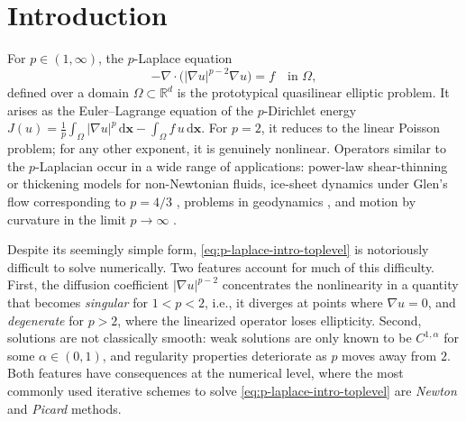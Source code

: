 \documentclass[11pt,pdflatex,sn-mathphys-num]{sn-jnl}
\theoremstyle{thmstyleone}%
\theoremstyle{thmstyletwo}%
\theoremstyle{thmstylethree}%
\newcommand{\bs}[1]{\ensuremath{\boldsymbol{#1}}}
\begin{document}


\maketitle

\section{Introduction}
\label{sec:lifting}
For $p\in(1,\infty)$, the $p$-Laplace equation 
\begin{equation}
\label{eq:p-laplace-intro-toplevel}
-\nabla\cdot\!\bigl(|\nabla u|^{p-2}\nabla u\bigr) = f
\quad\text{in } \Omega,
\end{equation}
defined over a domain $\Omega\subset \mathbb R^d$ is the prototypical quasilinear elliptic problem. It arises as the Euler--Lagrange equation of the $p$-Dirichlet energy $J(u)=\tfrac{1}{p}\!\int_{\Omega}\!|\nabla u|^{p}\,\mathrm{d}\bs x
   - \!\int_{\Omega}\! f\,u\,\mathrm{d}\bs x$.
For $p=2$, it reduces to the linear Poisson problem; for any other
exponent, it is genuinely nonlinear.
Operators similar to the $p$-Laplacian
occur in a wide range of applications:
power-law shear-thinning or thickening models for non-Newtonian fluids, ice-sheet dynamics under Glen's flow corresponding to $p=4/3$ \cite{CuffeyPaterson10,glaciology-Newton}, problems in geodynamics \cite{TurcotteSchubert02}, 
and motion by curvature in the limit $p\to\infty$ \cite{KohnSerfaty06,Oberman13}. 

Despite its seemingly simple form, \eqref{eq:p-laplace-intro-toplevel}
is notoriously difficult to solve numerically. Two features account for much of this difficulty. First, the diffusion coefficient $|\nabla u|^{p-2}$ concentrates the nonlinearity in a quantity that becomes \emph{singular} for $1<p<2$, i.e., it diverges at points where $\nabla u=0$, and \emph{degenerate} for $p>2$, where the linearized operator loses ellipticity.
Second, solutions are not classically smooth: weak solutions are only known to be $C^{1,\alpha}$ for some $\alpha\in(0,1)$, and regularity properties deteriorate as $p$ moves away from $2$. Both features have consequences at the numerical level, where the most commonly used iterative schemes to solve \eqref{eq:p-laplace-intro-toplevel} are \emph{Newton} and \emph{Picard} methods.
\end{document}
